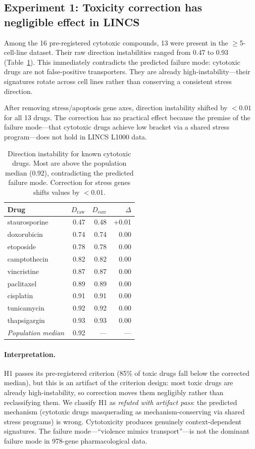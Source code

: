 \documentclass{article}
\begin{document}
\subsection{Experiment 1: Toxicity correction has negligible effect in LINCS}

Among the 16 pre-registered cytotoxic compounds, 13 were present in the
$\geq$5-cell-line dataset. Their raw direction instabilities ranged from
0.47 to 0.93 (Table~\ref{tab:toxic}). This immediately contradicts the
predicted failure mode: cytotoxic drugs are not false-positive transporters.
They are already high-instability---their signatures rotate across cell lines
rather than conserving a consistent stress direction.

After removing stress/apoptosis gene axes, direction instability shifted by
$<0.01$ for all 13 drugs. The correction has no practical effect because the
premise of the failure mode---that cytotoxic drugs achieve low bracket via
a shared stress program---does not hold in LINCS L1000 data.

\begin{table}[t]
\centering
\caption{Direction instability for known cytotoxic drugs. Most are above the
population median (0.92), contradicting the predicted failure mode.
Correction for stress genes shifts values by $<$0.01.}
\label{tab:toxic}
\small
\begin{tabular}{lrrr}
\toprule
Drug & $D_{\text{raw}}$ & $D_{\text{corr}}$ & $\Delta$ \\
\midrule
staurosporine & 0.47 & 0.48 & $+$0.01 \\
doxorubicin & 0.74 & 0.74 & 0.00 \\
etoposide & 0.78 & 0.78 & 0.00 \\
camptothecin & 0.82 & 0.82 & 0.00 \\
vincristine & 0.87 & 0.87 & 0.00 \\
paclitaxel & 0.89 & 0.89 & 0.00 \\
cisplatin & 0.91 & 0.91 & 0.00 \\
tunicamycin & 0.92 & 0.92 & 0.00 \\
thapsigargin & 0.93 & 0.93 & 0.00 \\
\midrule
\emph{Population median} & 0.92 & --- & --- \\
\bottomrule
\end{tabular}
\end{table}

\paragraph{Interpretation.}
H1 passes its pre-registered criterion (85\% of toxic drugs fall below
the corrected median), but this is an artifact of the criterion design: most
toxic drugs are already high-instability, so correction moves them
negligibly rather than reclassifying them. We classify H1 as
\emph{refuted with artifact pass}: the predicted mechanism (cytotoxic
drugs masquerading as mechanism-conserving via shared stress programs) is
wrong. Cytotoxicity produces genuinely context-dependent signatures.
The failure mode---``violence mimics transport''---is not the dominant
failure mode in 978-gene pharmacological data.
\end{document}
